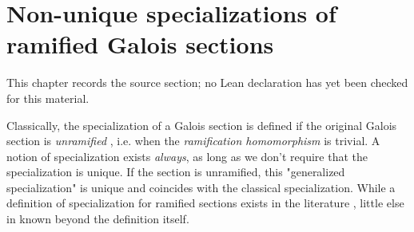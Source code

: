 \chapter{Non-unique specializations of ramified Galois sections}
\label{birational-section-conjecture-strong-birationality-chapter-03}

\begin{remark}
\label{birational-section-conjecture-strong-birationality-chapter-03-source}
This chapter records the source section; no Lean declaration has yet been checked for this material.
\notready
\end{remark}

\label{ramspe}

Classically, the specialization of a Galois section is defined if the original Galois section is \emph{unramified} \cite[\S 8.2]{sti13}, i.e. when the \emph{ramification homomorphism} is trivial. A notion of specialization exists \emph{always}, as long as we don't require that the specialization is unique. If the section is unramified, this "generalized specialization" is unique and coincides with the classical specialization. While a definition of specialization for ramified sections exists in the literature \cite[Corollary 8.9]{sti13}, little else in known beyond the definition itself.







